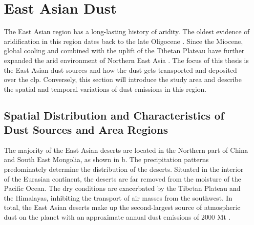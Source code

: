 
\section{East Asian Dust}
The East Asian region has a long-lasting history of aridity. The oldest evidence of aridification in this region dates back to the late Oligocene \parencite{qiang2011new}. Since the Miocene, global cooling and combined with the uplift of the Tibetan Plateau have further expanded the arid environment of Northern East Asia \parencite{miao2012controlled}.  
The focus of this thesis is the East Asian dust sources and how the dust gets transported and deposited over the \acrshort{clp}. Conversely, this section will introduce the study area and describe the spatial and temporal variations of dust emissions in this region.  

\subsection{Spatial Distribution and Characteristics of Dust Sources and Area Regions}\label{sec:spatial_temporal_dust}
The majority of the East Asian deserts are located in the Northern part of China and South East Mongolia, as shown in b. The precipitation patterns predominately determine the distribution of the deserts.
Situated in the interior of the Eurasian continent, the deserts are far removed from the moisture of the Pacific Ocean. 
The dry conditions are exacerbated by the Tibetan Plateau and the Himalayas, inhibiting the transport of air masses from the southwest.  
In total, the East Asian deserts make up the second-largest source of atmospheric dust on the planet with an approximate annual dust emissions of 2000 Mt \parencite{chen2017overview}. 

